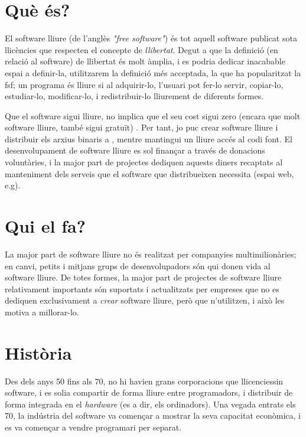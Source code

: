 \section{Què és?}

El software lliure (de l'anglès \emph{"free software"}) és tot aquell software publicat
sota llicències que respecten el concepte de \emph{llibertat}. Degut a que la definició
(en relació al software) de llibertat és molt àmplia, i es podria dedicar inacabable espai
a definir-la, utilitzarem la definició més acceptada, la que ha popularitzat la \ac{fsf}; un programa és lliure si al adquirir-lo, l'usuari pot fer-lo servir,
copiar-lo, estudiar-lo, modificar-lo, i redistribuir-lo lliurement de diferents formes. \cite{wikifree}

Que el software sigui lliure, no implica que el seu cost sigui zero (encara que molt
software lliure, també sigui gratuït) \cite{sellingfree}. Per tant, jo puc crear software lliure i distribuir els arxius
binaris a , mentre mantingui un lliure accés al codi font. El desenvolupament de software
lliure es sol finançar a través de donacions voluntàries, i la major part de projectes dediquen
aquests diners recaptats al manteniment dels serveis que el software que distribueixen necessita
(espai web, e.g).

\section{Qui el fa?}

La major part de software lliure no és realitzat per companyies multimilionàries; en canvi,
petits i mitjans grups de desenvolupadors són qui donen vida al software lliure.
De totes formes, la major part de projectes de software lliure relativament importants
són suportats i actualitzats per empreses que no es dediquen exclusivament a \emph{crear}
software lliure, però que n'utilitzen, i això les motiva a millorar-lo.

\section{Història}

Des dels anys 50 fins als 70, no hi havien grans corporacions que 
llicenciessin software, i es solia compartir de forma lliure entre
programadors, i distribuir de forma integrada en el \emph{hardware}
(es a dir, els ordinadors). Una vegada entrats els 70, la indústria del
software va començar a mostrar la seva capacitat econòmica, i es va
començar a vendre programari per separat. \cite{ibmusdata}

